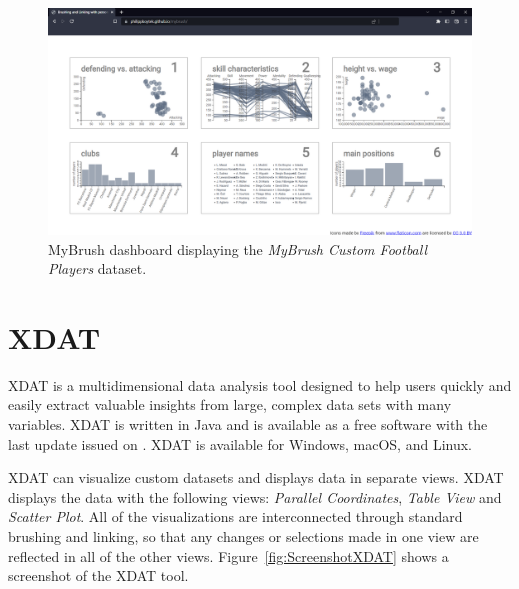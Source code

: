 \begin{figure}[tp]
\centering
\includegraphics[keepaspectratio,width=\linewidth,height=\halfh, frame]
{images/screenshot-mybrush.png}

\caption[MyBrush Dashboard]
{%
MyBrush dashboard displaying the \emph{MyBrush Custom Football Players} dataset.
}
\label{fig:ScreenshotMyBrush}
\end{figure}




\section{XDAT}

XDAT \parencite{XDAT} is a multidimensional data analysis tool designed to
help users quickly and easily extract valuable insights from large,
complex data sets with many variables. XDAT is written in Java and is
available as a free software with the last update issued on
. XDAT is available for Windows, macOS, and
Linux.

XDAT can visualize custom datasets and displays data in separate views.
XDAT displays the data with the following views: \emph{Parallel
Coordinates}, \emph{Table View} and \emph{Scatter Plot}. All of the
visualizations are interconnected through standard brushing and linking,
so that any changes or selections made in one view are reflected in all of
the other views. Figure~\ref{fig:ScreenshotXDAT} shows a screenshot of the
XDAT tool.




